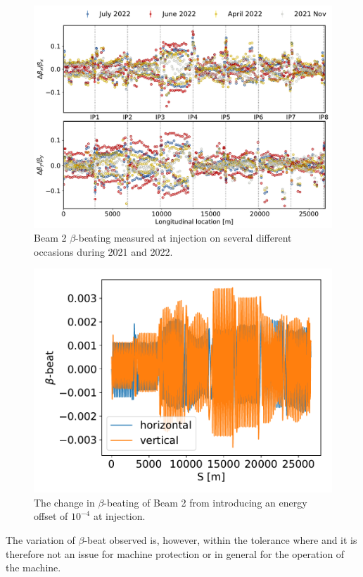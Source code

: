 \documentclass[a4paper]{cernatsnote}
\begin{document}
\begin{figure}
  \centering
\includegraphics[width=0.8\linewidth]{plots/beam2/comp_injection_several.pdf}
\caption{Beam 2 $\beta$-beating measured at injection on several different occasions during 2021 and 2022. }
\label{fig:comp_several_beam2}
\end{figure}

\begin{figure}
  \centering
\includegraphics[width=0.8\linewidth]{plots/beam2/injection_energy.pdf}
\caption{The change in $\beta$-beating of Beam 2 from introducing an energy offset of $10^{-4}$ at injection. }
\label{fig:energy_offset_injection}
\end{figure}

The variation of $\beta$-beat observed is, however, within the tolerance where and it is therefore not an issue for machine protection or in general for the operation of the machine. 
\end{document}
